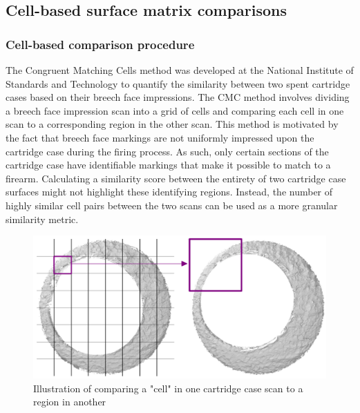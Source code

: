 \hypertarget{cell-based-surface-matrix-comparisons}{%
\subsection{Cell-based surface matrix
comparisons}\label{cell-based-surface-matrix-comparisons}}

\hypertarget{comparisonProcedure}{%
\subsubsection{Cell-based comparison
procedure}\label{comparisonProcedure}}

The Congruent Matching Cells method was developed at the National
Institute of Standards and Technology to quantify the similarity between
two spent cartridge cases based on their breech face impressions. The
CMC method involves dividing a breech face impression scan into a grid
of cells and comparing each cell in one scan to a corresponding region
in the other scan. This method is motivated by the fact that breech face
markings are not uniformly impressed upon the cartridge case during the
firing process. As such, only certain sections of the cartridge case
have identifiable markings that make it possible to match to a firearm.
Calculating a similarity score between the entirety of two cartridge
case surfaces might not highlight these identifying regions. Instead,
the number of highly similar cell pairs between the two scans can be
used as a more granular similarity metric.

\begin{Schunk}
\begin{figure}[htbp]

{\centering \includegraphics[width=\textwidth]{../images/cmc_illustration} 

}

\caption{\label{fig:cmc_illustration} Illustration of comparing a "cell" in one cartridge case scan to a region in another}\label{fig:unnamed-chunk-1}
\end{figure}
\end{Schunk}


